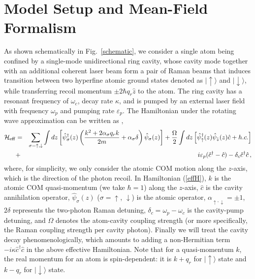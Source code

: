 \documentclass[atoms,article,submit,moreauthors,dvi2pdf,12pt,a4paper]{mdpi}
\def\ba{\begin{eqnarray}}
\def\ea{\end{eqnarray}}
\begin{document}
\section{Model Setup and Mean-Field Formalism} \label{meanfield}

As shown schematically in Fig.~\ref{schematic}, we consider a single atom being confined by a single-mode unidirectional ring cavity, whose cavity mode together with an additional coherent laser beam form a pair of Raman beams that induces transition between two hyperfine atomic ground states denoted as $|\uparrow\rangle$ and $|\downarrow\rangle$, while transferring recoil momentum $\pm 2\hbar q_r\hat{z}$ to the atom. The ring cavity has a resonant frequency of $\omega_c$, decay rate $\kappa$, and is pumped by an external laser field with frequency $\omega_p$ and pumping rate $\varepsilon_p$.
The Hamiltonian under the rotating wave approximation can be written as \cite{cavitySOC},
\ba
 \mathcal{H}_{\rm eff}& = & \sum_{\sigma=\uparrow,\downarrow} \int d{z}\left[ \hat{\psi}^\dagger_\sigma({z})\left(\frac{ { k}^2+ 2\alpha_\sigma q_r {k}}{2m}+\alpha_\sigma \delta\right)\hat{\psi}_\sigma(z)\right]+  \frac{\Omega}{2}\int d{z}\left[\hat{\psi}_{\uparrow}^{\dagger}({z})\hat{\psi}_{\downarrow}({z}) \hat{c}+ h.c. \right]\nonumber \\
 & + & i\varepsilon_{p}(\hat{c}^{\dagger}-\hat{c})-\delta_c \hat{c}^{\dagger}\hat{c} \,, \label{effH}
 \ea
where, for simplicity, we only consider the atomic COM motion along the $z$-axis, which is the direction of the photon recoil. In Hamiltonian (\ref{effH}), $k$ is the atomic COM quasi-momentum (we take $\hbar =1$) along the $z$-axis, $\hat{c}$ is the cavity annihilation operator, $\hat{\psi}_\sigma(z)$ ($\sigma = \uparrow$, $\downarrow$) is the atomic operator, $\alpha_{\uparrow, \downarrow}=\pm 1$, $2\delta$ represents the two-photon Raman detuning, $\delta_c=\omega_p-\omega_c$ is the cavity-pump detuning, and $\Omega$ denotes the atom-cavity coupling strength (or more specifically, the Raman coupling strength per cavity photon). Finally we will treat the cavity decay phenomenologically, which amounts to adding a non-Hermitian term $-i\kappa \hat{c}^{\dagger}\hat{c}$ in the above effective Hamiltonian. Note that for a quasi-momentum $k$, the real momentum for an atom is spin-dependent: it is $k+q_r$ for $|\uparrow \rangle$ state and $k-q_r$ for $|\downarrow \rangle$ state.
\end{document}
